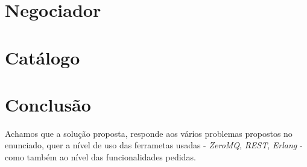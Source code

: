 \documentclass[12pt, a4paper]{report}
\begin{document}
 
\chapter{Negociador}

\chapter{Catálogo}

\chapter{Conclusão}

Achamos que a solução proposta, responde aos vários problemas propostos no
enunciado, quer a nível de uso das ferrametas usadas - \textit{ZeroMQ},
\textit{REST}, \textit{Erlang} - como também ao nível das funcionalidades
pedidas.
\end{document}
